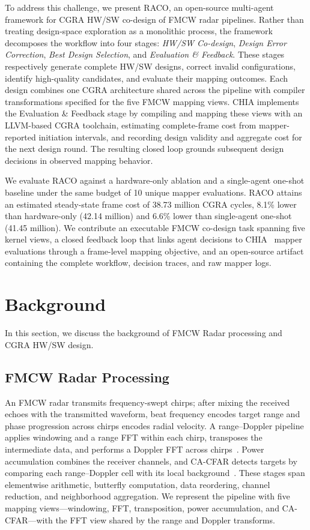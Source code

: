 \documentclass[conference,letterpaper]{IEEEtran}
\begin{document}
To address this challenge, we present RACO, an open-source multi-agent framework for CGRA HW/SW co-design of FMCW radar pipelines. Rather than treating design-space exploration as a monolithic process, the framework decomposes the workflow into four stages: \textit{HW/SW Co-design}, \textit{Design Error Correction}, \textit{Best Design Selection}, and \textit{Evaluation \& Feedback}. These stages respectively generate complete HW/SW designs, correct invalid configurations, identify high-quality candidates, and evaluate their mapping outcomes. Each design combines one CGRA architecture shared across the pipeline with compiler transformations specified for the five FMCW mapping views. CHIA implements the Evaluation \& Feedback stage by compiling and mapping these views with an LLVM-based CGRA toolchain, estimating complete-frame cost from mapper-reported initiation intervals, and recording design validity and aggregate cost for the next design round. The resulting closed loop grounds subsequent design decisions in observed mapping behavior.


We evaluate RACO against a hardware-only ablation and a single-agent one-shot baseline under the same budget of 10 unique mapper evaluations. RACO attains an estimated steady-state frame cost of 38.73 million CGRA cycles, 8.1\% lower than hardware-only (42.14 million) and 6.6\% lower than single-agent one-shot (41.45 million). We contribute an executable FMCW co-design task spanning five kernel views, a closed feedback loop that links agent decisions to CHIA~\cite{cui2026chia} mapper evaluations through a frame-level mapping objective, and an open-source artifact containing the complete workflow, decision traces, and raw mapper logs.


\section{Background}
In this section, we discuss the background of FMCW Radar processing and CGRA HW/SW design.

\subsection{FMCW Radar Processing}
An FMCW radar transmits frequency-swept chirps; after mixing the received echoes with the transmitted waveform, beat frequency encodes target range and phase progression across chirps encodes radial velocity. A range--Doppler pipeline applies windowing and a range FFT within each chirp, transposes the intermediate data, and performs a Doppler FFT across chirps~\cite{li2021signal}. Power accumulation combines the receiver channels, and CA-CFAR detects targets by comparing each range--Doppler cell with its local background~\cite{rohling1983radar}. These stages span elementwise arithmetic, butterfly computation, data reordering, channel reduction, and neighborhood aggregation. We represent the pipeline with five mapping views—windowing, FFT, transposition, power accumulation, and CA-CFAR—with the FFT view shared by the range and Doppler transforms.
\end{document}
